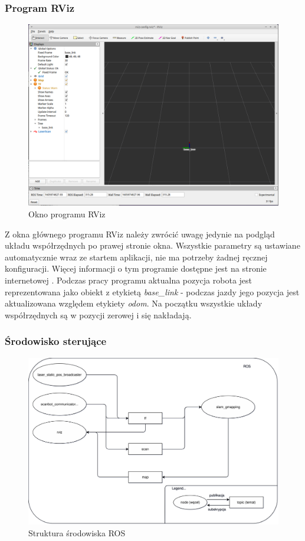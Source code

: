 \subsubsection{Program RViz}
\begin{figure}[ht]
	\centering
		\includegraphics[width=1\linewidth]{rys/main-app-view-4.PNG}
	\caption{Okno programu RViz}
	\label{fig:rviz-window}
\end{figure}

Z okna głównego programu RViz należy zwrócić uwagę jedynie na podgląd układu współrzędnych po prawej stronie okna. Wszystkie parametry są ustawiane automatycznie wraz ze startem aplikacji, nie ma potrzeby żadnej ręcznej konfiguracji. Więcej informacji o tym programie dostępne jest na stronie internetowej \cite{rviz}.
Podczas pracy programu aktualna pozycja robota jest reprezentowana jako obiekt z etykietą \emph{base\_link} - podczas jazdy jego pozycja jest aktualizowana względem etykiety \emph{odom}. Na początku wszystkie układy współrzędnych są w pozycji zerowej i się nakładają.

\subsubsection{Środowisko sterujące}
\label{sec:ros-env}
\begin{figure}[ht]
	\centering
		\includegraphics[width=1\linewidth]{rys/pc-application-infrastructure.pdf}
	\caption{Struktura środowiska ROS}
	\label{fig:pc-app-ros-infrastructure}
\end{figure}

